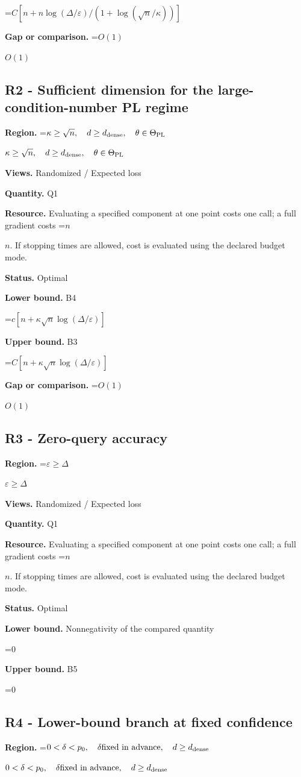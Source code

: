 \documentclass[10pt,a4paper]{article}
\newcommand{\AtlasMath}[1]{\par\begingroup\centering\setbox0=\hbox{$\displaystyle #1$}\ifdim\wd0>1.4\linewidth\typeout{ATLAS WIDE FORMULA: \the\wd0}\fi\ifdim\wd0>\linewidth\resizebox{\linewidth}{!}{\box0}\else\box0\fi\par\endgroup}
\newcommand{\AtlasInlineMath}[1]{\begingroup\setbox0=\hbox{$#1$}\ifdim\wd0>.4\linewidth\endgroup\AtlasMath{#1}\else\endgroup$#1$\fi}
\begin{document}
\AtlasMath{C[n+n\log(\Delta/\varepsilon)/(1+\log(\sqrt n/\kappa))]}
\textbf{Gap or comparison.} \AtlasInlineMath{O(1)}

\subsection{R2 - Sufficient dimension for the large-condition-number PL regime}
\textbf{Region.} \AtlasInlineMath{\kappa\ge\sqrt n,\quad d\ge d_{\rm dense},\quad\theta\in\Theta_{\rm PL}}

\textbf{Views.} Randomized / Expected loss

\textbf{Quantity.} Q1

\textbf{Resource.} Evaluating a specified component at one point costs one call; a full gradient costs \AtlasInlineMath{n}. If stopping times are allowed, cost is evaluated using the declared budget mode.

\textbf{Status.} Optimal

\textbf{Lower bound.} B4

\AtlasMath{c[n+\kappa\sqrt n\log(\Delta/\varepsilon)]}
\textbf{Upper bound.} B3

\AtlasMath{C[n+\kappa\sqrt n\log(\Delta/\varepsilon)]}
\textbf{Gap or comparison.} \AtlasInlineMath{O(1)}

\subsection{R3 - Zero-query accuracy}
\textbf{Region.} \AtlasInlineMath{\varepsilon\ge\Delta}

\textbf{Views.} Randomized / Expected loss

\textbf{Quantity.} Q1

\textbf{Resource.} Evaluating a specified component at one point costs one call; a full gradient costs \AtlasInlineMath{n}. If stopping times are allowed, cost is evaluated using the declared budget mode.

\textbf{Status.} Optimal

\textbf{Lower bound.} Nonnegativity of the compared quantity

\AtlasMath{0}
\textbf{Upper bound.} B5

\AtlasMath{0}
\subsection{R4 - Lower-bound branch at fixed confidence}
\textbf{Region.} \AtlasInlineMath{0<\delta<p_0,\quad\delta\text{fixed in advance},\quad d\ge d_{\rm dense}}
\end{document}
